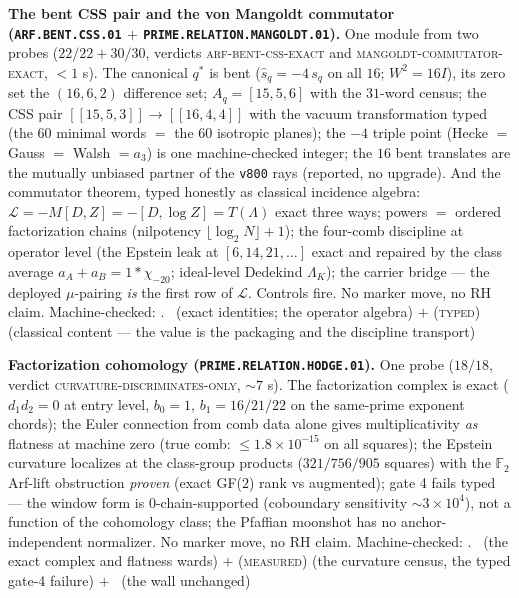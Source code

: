 \par\smallskip\noindent\textbf{The bent CSS pair and the von
Mangoldt commutator (\texttt{ARF.BENT.CSS.01} $+$
\texttt{PRIME.RELATION.MANGOLDT.01}).}
One module from two probes ($22/22 + 30/30$, verdicts
\textsc{arf-bent-css-exact} and
\textsc{mangoldt-commutator-exact}, ${<}1$ s).  The canonical
$q^{*}$ is bent ($\hat s_q = -4\,s_q$ on all $16$; $W^2 = 16I$),
its zero set the $(16,6,2)$ difference set; $A_q = [15,5,6]$
with the $31$-word census; the CSS pair $[[15,5,3]] \to
[[16,4,4]]$ with the vacuum transformation typed (the $60$
minimal words $=$ the $60$ isotropic planes); the $-4$ triple
point (Hecke $=$ Gauss $=$ Walsh $= a_3$) is one machine-checked
integer; the $16$ bent translates are the mutually unbiased
partner of the \texttt{v800} rays (reported, no upgrade).  And
the commutator theorem, typed honestly as classical incidence
algebra: $\mathcal L = -M[D,Z] = -[D, \log Z] = T(\Lambda)$
exact three ways; powers $=$ ordered factorization chains
(nilpotency $\lfloor\log_2 N\rfloor + 1$); the four-comb
discipline at operator level (the Epstein leak at $[6,14,21,
\dots]$ exact and repaired by the class average $a_A + a_B =
1 * \chi_{-20}$; ideal-level Dedekind $\Lambda_K$); the carrier
bridge --- the deployed $\mu$-pairing \emph{is} the first row of
$\mathcal L$.  Controls fire.  No marker move, no RH claim.
Machine-checked: .
\mE\ (exact identities; the operator algebra) $+$
(\textsc{typed}) (classical content --- the value is the
packaging and the discipline transport)
\par\smallskip


\par\smallskip\noindent\textbf{Factorization cohomology
(\texttt{PRIME.RELATION.HODGE.01}).}
One probe ($18/18$, verdict
\textsc{curvature-discriminates-only}, ${\sim}7$ s).  The
factorization complex is exact ($d_1 d_2 = 0$ at entry level,
$b_0 = 1$, $b_1 = 16/21/22$ on the same-prime exponent chords);
the Euler connection from comb data alone gives multiplicativity
\emph{as} flatness at machine zero (true comb: $\le
1.8\times10^{-15}$ on all squares); the Epstein curvature
localizes at the class-group products ($321/756/905$ squares)
with the $\mathbb{F}_2$ Arf-lift obstruction \emph{proven} (exact
GF($2$) rank vs augmented); gate 4 fails typed --- the window
form is $0$-chain-supported (coboundary sensitivity $\sim
3\times10^{4}$), not a function of the cohomology class; the
Pfaffian moonshot has no anchor-independent normalizer.  No
marker move, no RH claim.
Machine-checked: .
\mE\ (the exact complex and flatness wards) $+$
(\textsc{measured}) (the curvature census, the typed gate-4
failure) $+$ \mO\ (the wall unchanged)
\par\smallskip


